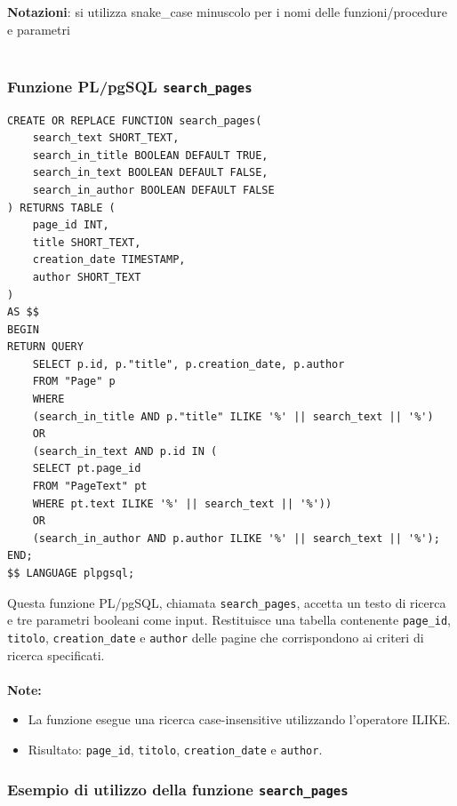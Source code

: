 \documentclass{article}
\begin{document}
\textbf{Notazioni}: si utilizza snake\_case minuscolo per i nomi delle funzioni/procedure e parametri
\\\\

\subsubsection{Funzione PL/pgSQL \texttt{search\_pages}}
	
\begin{lstlisting}[style=SQL, caption={Funzione SQL per la ricerca di pagine}]
CREATE OR REPLACE FUNCTION search_pages(
	search_text SHORT_TEXT,
	search_in_title BOOLEAN DEFAULT TRUE,
	search_in_text BOOLEAN DEFAULT FALSE,
	search_in_author BOOLEAN DEFAULT FALSE
) RETURNS TABLE (
	page_id INT,
	title SHORT_TEXT,
	creation_date TIMESTAMP,
	author SHORT_TEXT
) 
AS $$
BEGIN
RETURN QUERY
	SELECT p.id, p."title", p.creation_date, p.author
	FROM "Page" p
	WHERE
	(search_in_title AND p."title" ILIKE '%' || search_text || '%') 
	OR
	(search_in_text AND p.id IN (
	SELECT pt.page_id 
	FROM "PageText" pt
	WHERE pt.text ILIKE '%' || search_text || '%')) 
	OR
	(search_in_author AND p.author ILIKE '%' || search_text || '%');
END;
$$ LANGUAGE plpgsql;
\end{lstlisting}
Questa funzione PL/pgSQL, chiamata \texttt{search\_pages}, accetta un testo di ricerca e tre parametri booleani come input. Restituisce una tabella contenente \texttt{page\_id}, \texttt{titolo}, \texttt{creation\_date} e \texttt{author} delle pagine che corrispondono ai criteri di ricerca specificati. 
\\\\
\textbf{Note:} 
\begin{itemize}
	\item La funzione esegue una ricerca case-insensitive utilizzando l'operatore ILIKE.
	\item Risultato: \texttt{page\_id}, \texttt{titolo}, \texttt{creation\_date} e \texttt{author}.
\end{itemize}

\newpage

\subsubsection{Esempio di utilizzo della funzione \texttt{search\_pages}}
\end{document}
